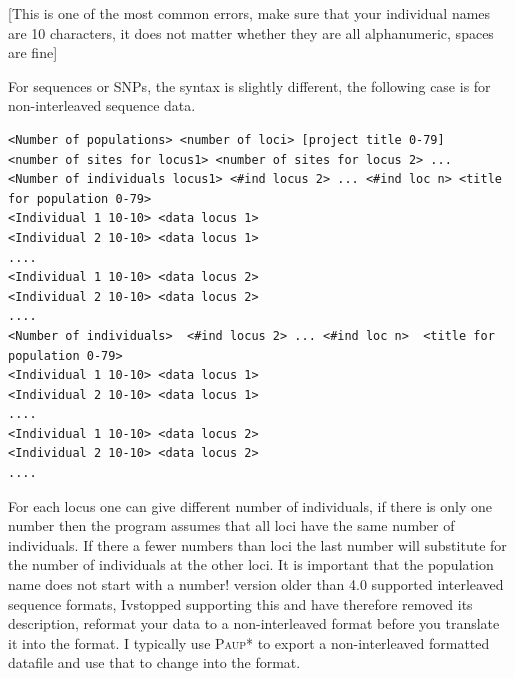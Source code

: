[This is one of the most common errors, make sure that your individual names are 10 characters, it does not matter whether they are all alphanumeric, spaces are fine]
\par
For sequences or SNPs, the syntax is slightly different, the following case 
is for non-interleaved sequence data.
 \begin{small}
\begin{tt}
\begin{verbatim}
<Number of populations> <number of loci> [project title 0-79]
<number of sites for locus1> <number of sites for locus 2> ...
<Number of individuals locus1> <#ind locus 2> ... <#ind loc n> <title for population 0-79>
<Individual 1 10-10> <data locus 1>
<Individual 2 10-10> <data locus 1>
....
<Individual 1 10-10> <data locus 2>
<Individual 2 10-10> <data locus 2>
....
<Number of individuals>  <#ind locus 2> ... <#ind loc n>  <title for population 0-79>
<Individual 1 10-10> <data locus 1>
<Individual 2 10-10> <data locus 1>
....
<Individual 1 10-10> <data locus 2>
<Individual 2 10-10> <data locus 2>
....
\end{verbatim}
\end{tt}
\end{small}
For each locus one can give different number of individuals, if there is only one number then the program assumes that all loci have the same number of individuals. If there a fewer numbers than loci
the last number will substitute for the number of individuals at the other loci. It is important that the population name does not start with a number!
\smallskip
\migrate version older than 4.0 supported interleaved sequence formats, Ivstopped supporting this and have therefore removed its description, reformat your data to a non-interleaved format before you translate it into the \migrate format. I typically use \textsc{Paup*} \cite{swofford2003} to export a non-interleaved \phylip formatted datafile and use that to change into the \migrate format.
